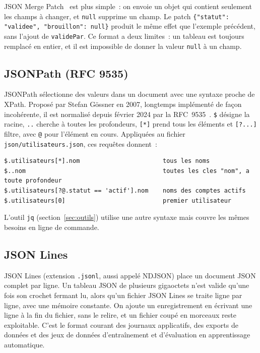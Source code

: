 \documentclass[12pt,a4paper]{article}
\begin{document}
JSON Merge Patch~\cite{hoffman2014rfc7396} est plus simple~: on envoie un objet qui contient seulement les champs à changer, et \texttt{null} supprime un champ. Le patch \texttt{\{"statut": "validee", "brouillon": null\}} produit le même effet que l'exemple précédent, sans l'ajout de \texttt{validePar}. Ce format a deux limites~: un tableau est toujours remplacé en entier, et il est impossible de donner la valeur \texttt{null} à un champ.

\subsection{JSONPath (RFC 9535)}
JSONPath sélectionne des valeurs dans un document avec une syntaxe proche de XPath. Proposé par Stefan Gössner en 2007, longtemps implémenté de façon incohérente, il est normalisé depuis février 2024 par la RFC~9535~\cite{gossner2024rfc9535}. \texttt{\$} désigne la racine, \texttt{..} cherche à toutes les profondeurs, \texttt{[*]} prend tous les éléments et \texttt{[?...]} filtre, avec \texttt{@} pour l'élément en cours. Appliquées au fichier \texttt{json/utilisateurs.json}, ces requêtes donnent~:

\begin{lstlisting}[caption={Requêtes JSONPath}]
$.utilisateurs[*].nom                       tous les noms
$..nom                                      toutes les cles "nom", a toute profondeur
$.utilisateurs[?@.statut == 'actif'].nom    noms des comptes actifs
$.utilisateurs[0]                           premier utilisateur
\end{lstlisting}

L'outil \texttt{jq} (section~\ref{sec:outils}) utilise une autre syntaxe mais couvre les mêmes besoins en ligne de commande.

\subsection{JSON Lines}
\label{sec:jsonl}
JSON Lines (extension \texttt{.jsonl}, aussi appelé NDJSON) place un document JSON complet par ligne. Un tableau JSON de plusieurs gigaoctets n'est valide qu'une fois son crochet fermant lu, alors qu'un fichier JSON Lines se traite ligne par ligne, avec une mémoire constante. On ajoute un enregistrement en écrivant une ligne à la fin du fichier, sans le relire, et un fichier coupé en morceaux reste exploitable. C'est le format courant des journaux applicatifs, des exports de données et des jeux de données d'entraînement et d'évaluation en apprentissage automatique.
\end{document}
